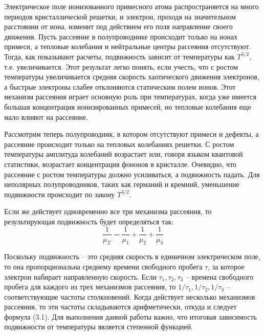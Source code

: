 Электрическое поле ионизованного примесного атома распространяется на много периодов кристаллической решетки, и
электрон, проходя на значительном расстоянии от иона, изменит под действием его поля направление своего движения. Пусть
рассеяние в полупроводнике происходит только на ионах примеси, а тепловые колебания и нейтральные центры рассеяния
отсутствуют. Тогда, как показывают расчеты, подвижность зависит от температуры как $T^{3/2}$, т.е. увеличивается. Этот
результат легко понять, если учесть, что с ростом температуры увеличивается средняя скорость хаотического движения
электронов, а быстрые электроны слабее отклоняются статическим полем ионов. Этот механизм рассеяния играет основную роль
при температурах, когда уже имеется большая концентрация ионизированных примесей, но тепловые колебания еще мало влияют
на рассеяние. 

Рассмотрим теперь полупроводник, в котором отсутствуют примеси и дефекты, а рассеяние происходит только на тепловых
колебаниях решетки. С ростом температуры амплитуда колебаний возрастает или, говоря языком квантовой статистики,
возрастает концентрация фононов в кристалле. Очевидно, что рассеяние с ростом температуры должно усиливаться, а
подвижность падать. Для неполярных полупроводников, таких как германий и кремний, уменьшение подвижности происходит по
закону $T^{3/2}$. 

Если же действует одновременно все три механизма рассеяния, то результирующая подвижность будет определяться так: 
\begin{equation}
	\frac{1}{\mu_{\Sigma}} = \frac{1}{\mu_{1}}+\frac{1}{\mu_{2}}+\frac{1}{\mu_{3}}
	\label{eq:3.1}
\end{equation}

Поскольку подвижность – это средняя скорость в единичном электрическом поле, то она пропорциональна среднему времени
свободного пробега $\tau$, за которое электрон набирает направленную скорость. Если $\tau_1, \tau_2,\tau_3$ – времена свободного
пробега для каждого из трех механизмов рассеяния, то $1/\tau_1,1/\tau_2,1/\tau_3$ – соответствующие частоты столкновений. Когда
действует несколько механизмов рассеяния, то эти частоты складываются арифметически, откуда и следует формула (3.1). Для
выполнения данной работы важно, что итоговая зависимость подвижности от температуры является степенной функцией.

